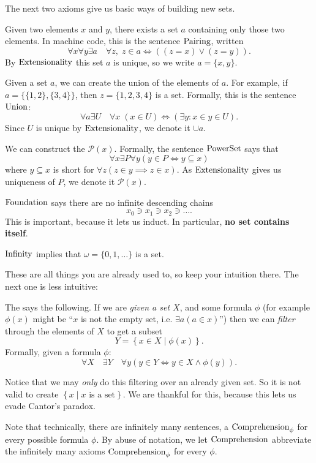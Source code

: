 The next two axioms give us basic ways of building new sets.
\begin{itemize}
	\ii Given two elements $x$ and $y$, there exists a set $a$ containing only those two elements.
	In machine code, this is the sentence $\mathrm{Pairing}$, written
	\[ \forall x \forall y \exists a \quad \forall z,
		\; z \in a \iff \left( (z=x) \lor (z=y) \right). \]
	By $\mathrm{Extensionality}$ this set $a$ is unique, so we write $a = \{x,y\}$.

	\ii Given a set $a$, we can create the union of the elements of $a$.
	For example, if $a = \{ \{1,2\}, \{3,4\} \}$, then $z = \{1,2,3,4\}$ is a set.
	Formally, this is the sentence $\mathrm{Union}$:
	\[ \forall a \exists U \quad \forall x \; (x \in U) \iff (\exists y : x \in y \in U). \]
	Since $U$ is unique by $\mathrm{Extensionality}$, we denote it $\cup a$.

	\ii 
	We can construct the  $\mathcal P(x)$.
	Formally, the sentence $\mathrm{PowerSet}$ says that
	\[ \forall x \exists P \forall y (y \in P \iff y \subseteq x) \]
	where $y \subseteq x$ is short for $\forall z (z \in y \implies z \in x)$.
	As $\mathrm{Extensionality}$ gives us uniqueness of $P$,
	we denote it $\mathcal P(x)$.

	\ii $\mathrm{Foundation}$ says there are no infinite descending chains
	\[ x_0 \ni x_1 \ni x_2 \ni \dots. \]
	This is important, because it lets us induct.
	In particular, \textbf{no set contains itself}.

	\ii $\mathrm{Infinity}$ implies that $\omega = \{0,1,\dots\}$ is a set.
\end{itemize}
These are all things you are already used to, so keep your intuition there.
The next one is less intuitive:
\begin{itemize}
	\ii The  says the following.
	If we are \emph{given a set $X$}, and some formula $\phi$
	(for example $\phi(x)$ might be ``$x$ is not the empty set, i.e. $\exists a(a\in x)$'')
	then we can \emph{filter} through the elements of $X$ to get a subset
	\[ Y = \left\{ x \in X \mid \phi(x) \right\}. \]
	Formally, given a formula $\phi$:
	\[
		\forall X \quad \exists Y \quad
		\forall y (y \in Y \iff y \in X \land \phi(y)).
	\]
\end{itemize}
Notice that we may \emph{only} do this filtering over an already given set.
So it is not valid to create
$ \left\{ x \mid x \text{ is a set} \right\} $.
We are thankful for this, because this lets us evade Cantor's paradox.

\begin{abuse}
	Note that technically, there are infinitely many sentences,
	a $\mathrm{Comprehension}_\phi$ for every possible formula $\phi$.
	By abuse of notation, we let $\mathrm{Comprehension}$ abbreviate
	the infinitely many axioms $\mathrm{Comprehension}_\phi$ for every $\phi$.
\end{abuse}

